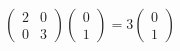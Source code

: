 \begin{equation}
	\begin{pmatrix} 2 & 0\\ 0 & 3 \end{pmatrix} \begin{pmatrix} 0 \\ 1 \end{pmatrix}
	= 3 \begin{pmatrix} 0 \\ 1 \end{pmatrix}
\end{equation}
